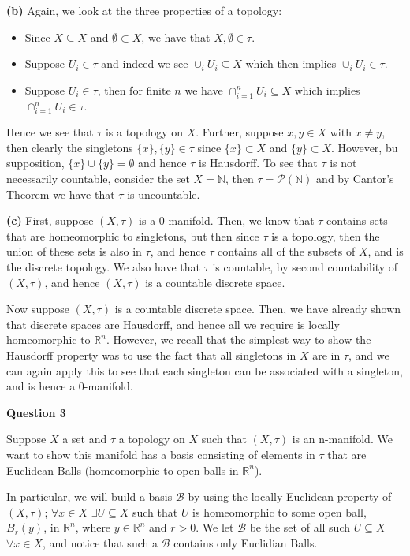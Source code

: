 \documentclass[10pt]{article}
\newcommand{\R}{\mathbb{R}}
\newcommand{\N}{\mathbb{N}}
\begin{document}
\textbf{(b)} Again, we look at the three properties of a topology:
\begin{itemize}
\item Since $X\subseteq X$ and $\emptyset \subset X$, we have that $X,\emptyset \in \tau$.
\item Suppose $U_{i} \in \tau$ and indeed we see $\cup_{i}U_{i} \subseteq X$ which then implies $\cup_{i}U_{i} \in \tau$.
\item Suppose $U_{i} \in \tau$, then for finite $n$ we have $\cap_{i=1}^{n}U_{i} \subseteq X$ which implies $\cap_{i=1}^{n}U_{i} \in \tau$.
\end{itemize}

Hence we see that $\tau$ is a topology on $X$. Further, suppose $x,y\in X$ with $x \neq y$, then clearly the singletons $\{x\},\{y\} \in \tau$ since $\{x\} \subset X$ and $\{y\} \subset X$. However, bu supposition, $\{x\} \cup \{y\} = \emptyset$ and hence $\tau$ is Hausdorff. To see that $\tau$ is not necessarily countable, consider the set $X = \N$, then $\tau = \mathcal{P}(\N)$ and by Cantor's Theorem we have that $\tau$ is uncountable.

\textbf{(c)} First, suppose $(X,\tau)$ is a 0-manifold. Then, we know that $\tau$ contains sets that are homeomorphic to singletons, but then since $\tau$ is a topology, then the union of these sets is also in $\tau$, and hence $\tau$ contains all of the subsets of $X$, and is the discrete topology. We also have that $\tau$ is countable, by second countability of $(X,\tau)$, and hence $(X,\tau)$ is a countable discrete space.

Now suppose $(X,\tau)$ is a countable discrete space. Then, we have already shown that discrete spaces are Hausdorff, and hence all we require is locally homeomorphic to $\R^{n}$. However, we recall that the simplest way to show the Hausdorff property was to use the fact that all singletons in $X$ are in $\tau$, and we can again apply this to see that each singleton can be associated with a singleton, and is hence a 0-manifold.

\newpage

\textbf{Question 3}

Suppose $X$ a set and $\tau$ a topology on $X$ such that $(X,\tau)$ is an n-manifold. We want to show this manifold has a basis consisting of elements in $\tau$ that are Euclidean Balls (homeomorphic to open balls in $\R^{n}$).

In particular, we will build a basis $\mathcal{B}$ by using the locally Euclidean property of $(X,\tau)$; $\forall x\in X$ $ \exists U\subseteq X$ such that $U$ is homeomorphic to some open ball, $B_{r}(y)$, in $\R^{n}$, where $y\in \R^{n}$ and $r>0$. We let $\mathcal{B}$ be the set of all such $U \subseteq X$ $\forall x \in X$, and notice that such a $\mathcal{B}$ contains only Euclidian Balls.
\end{document}
